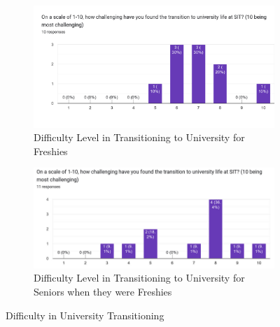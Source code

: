 \begin{figure}[H]
  \begin{subfigure}[b]{0.5\textwidth}
    \includegraphics[width=\textwidth]{Figures/Survey/freshie_2.png}
     \caption{\footnotesize Difficulty Level in Transitioning to University for Freshies}
       \label{freshies_difficulty_level_transition}
  \end{subfigure}
  \hfill
  \begin{subfigure}[b]{0.5\textwidth}
    \includegraphics[width=\textwidth]{Figures/Survey/senior_survey.png}
       \caption{\footnotesize Difficulty Level in Transitioning to University for Seniors when they were Freshies}
       \label{senior_difficulty_level_transition}
  \end{subfigure}
  \caption{Difficulty in University Transitioning}
\end{figure}


